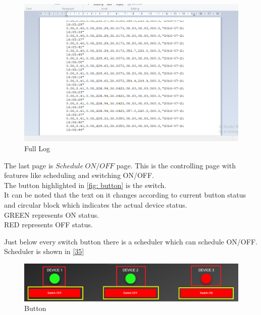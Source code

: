 \documentclass[a4paper,12pt,oneside]{book}
\begin{document}
\begin{itemize}
	\begin{figure}[H]  \centering
		\includegraphics[width=15cm]{full.png}
		\caption{Full Log}
		\label{26}
	\end{figure}
	\item{ The last page is $Schedule\ ON/OFF$ page. This is the controlling page with features like scheduling and switching ON/OFF.\\ 
	The button highlighted in \autoref{fig: button} is the switch.\\It can be noted that the text on it changes according to current button status and circular block which indicates the actual device status.\\
	GREEN represents ON status.\\RED represents OFF status.
	
	\item{Just below every switch button there is a scheduler which can schedule ON/OFF. Scheduler is shown in \autoref{35}}\\
			
			\begin{figure}[H]  \centering
				\includegraphics[width=15cm]{feedback.png}				\caption{Button}
				\label{fig: button}
			\end{figure}

}
\end{itemize}
\end{document}
